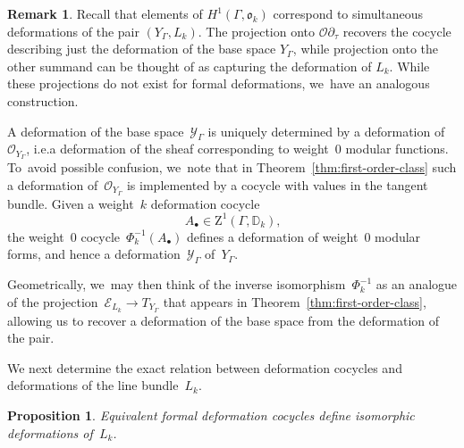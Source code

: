 \documentclass[10pt,a4paper]{article}
\numberwithin{equation}{section}
\let\oldbullet\bullet
\renewcommand{\bullet}{{\scriptscriptstyle\oldbullet}}
\theoremstyle{plain}
\newtheorem{proposition}[theoremcounter]{Proposition}
\theoremstyle{definition}
\newtheorem{remark}[theoremcounter]{Remark}
\newcommand{\tx}{\text}
\newcommand{\bbD}{\ensuremath{\mathbb{D}}}
\newcommand{\cE}{\ensuremath{\mathcal{E}}}
\newcommand{\cO}{\ensuremath{\mathcal{O}}}
\newcommand{\cY}{\ensuremath{\mathcal{Y}}}
\newcommand{\frako}{\ensuremath{\mathfrak{o}}}
\newcommand{\rmZ}{\ensuremath{\mathrm{Z}}}
\let\Ga\Gamma
\begin{document}
\begin{remark}\label{subsec:base-def}
Recall that elements of $H^1(\Ga,\frako_k)$ correspond to simultaneous deformations of the pair $(Y_\Ga,L_k)$. The projection onto $\cO \partial_\tau$ recovers the cocycle describing just the deformation of the base space $Y_\Ga$, while projection onto the other summand can be thought of as capturing the deformation of $L_k$. While these projections do not exist for formal deformations, we~have an analogous construction.

A deformation of the base space~$\cY_\Ga$ is uniquely determined by a deformation of~$\cO_{Y_\Ga}$, i.e.\@ a deformation of the sheaf corresponding to weight~$0$ modular functions. To~avoid possible confusion, we~note that in Theorem~\ref{thm:first-order-class} such a deformation of~$\cO_{Y_\Ga}$ is implemented by a cocycle with values in the tangent bundle. Given a weight~$k$ deformation cocycle\vspace*{-3pt}
\begin{equation*}
A_\bullet \in \rmZ^1(\Ga,\bbD_k)
\tx{,}
\end{equation*}
the weight~$0$ cocycle~$\Phi_k^{-1}(A_\bullet)$ defines a deformation of weight~$0$ modular forms, and hence a deformation~$\cY_\Ga$ of~$Y_\Ga$.

Geometrically, we~may then think of the inverse isomorphism~$\Phi_k^{-1}$ as an analogue of the projection~$\cE_{L_k} \to T_{Y_\Ga}$ that appears in Theorem~\ref{thm:first-order-class}, allowing us to recover a deformation of the base space from the deformation of the pair.
\end{remark}

We next determine the exact relation between deformation cocycles and deformations of the line bundle~$L_k$.

\begin{proposition}
\label{prop:equivalent-cocycles}
Equivalent formal deformation cocycles define isomorphic deformations of~\/$L_k$.
\end{proposition}
\end{document}
